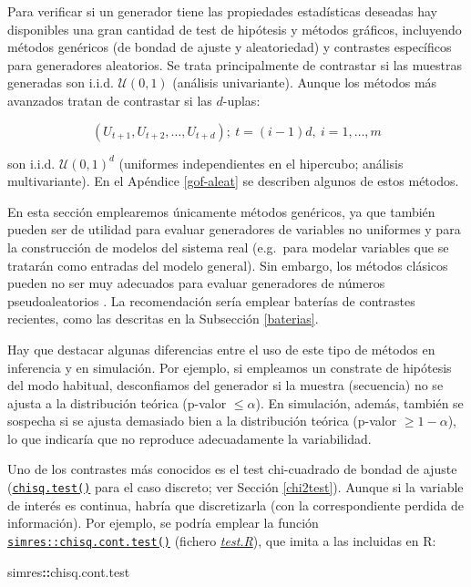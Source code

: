 \documentclass[
  spanish,
  10pt,
]{book}
\newenvironment{Shaded}{\begin{snugshade}}{\end{snugshade}}
\newcommand{\NormalTok}[1]{#1}
\newcommand{\SpecialCharTok}[1]{\textcolor[rgb]{0.81,0.36,0.00}{\textbf{#1}}}
\theoremstyle{break}
\theoremstyle{nonumberplain}
\begin{document}
Para verificar si un generador tiene las propiedades estadísticas deseadas hay disponibles una gran cantidad de test de hipótesis y métodos gráficos,
incluyendo métodos genéricos (de bondad de ajuste y aleatoriedad) y contrastes específicos para generadores aleatorios.
Se trata principalmente de contrastar si las muestras generadas son i.i.d. \(\mathcal{U}\left(0,1\right)\) (análisis univariante).
Aunque los métodos más avanzados tratan de contrastar si las \(d\)-uplas:

\[(U_{t+1},U_{t+2},\ldots,U_{t+d}); \ t=(i-1)d, \ i=1,\ldots,m\]

son i.i.d. \(\mathcal{U}\left(0,1\right)^{d}\) (uniformes independientes en el hipercubo; análisis multivariante).
En el Apéndice \ref{gof-aleat} se describen algunos de estos métodos.

En esta sección emplearemos únicamente métodos genéricos, ya que también pueden ser de utilidad para evaluar generadores de variables no uniformes y para la construcción de modelos del sistema real (e.g.~para modelar variables que se tratarán como entradas del modelo general).
Sin embargo, los métodos clásicos pueden no ser muy adecuados para evaluar generadores de números pseudoaleatorios \citep[ver][]{lecuyer07}.
La recomendación sería emplear baterías de contrastes recientes, como las descritas en la Subsección \ref{baterias}.

Hay que destacar algunas diferencias entre el uso de este tipo de métodos en inferencia y en simulación.
Por ejemplo, si empleamos un constrate de hipótesis del modo habitual, desconfiamos del generador si la muestra (secuencia) no se ajusta a la distribución teórica (p-valor \(\leq \alpha\)).
En simulación, además, también se sospecha si se ajusta demasiado bien a la distribución teórica (p-valor \(\geq1-\alpha\)), lo que indicaría que no reproduce adecuadamente la variabilidad.

Uno de los contrastes más conocidos es el test chi-cuadrado de bondad de ajuste (\href{https://rdrr.io/r/stats/chisq.test.html}{\texttt{chisq.test()}} para el caso discreto; ver Sección \ref{chi2test}).
Aunque si la variable de interés es continua, habría que discretizarla (con la correspondiente perdida de información).
Por ejemplo, se podría emplear la función \href{https://rubenfcasal.github.io/simres/reference/chisq.cont.test.html}{\texttt{simres::chisq.cont.test()}} (fichero \href{R/test.R}{\emph{test.R}}), que imita a las incluidas en R:

\begin{Shaded}
\begin{Highlighting}[]
\NormalTok{simres}\SpecialCharTok{::}\NormalTok{chisq.cont.test}
\end{Highlighting}
\end{Shaded}
\end{document}
